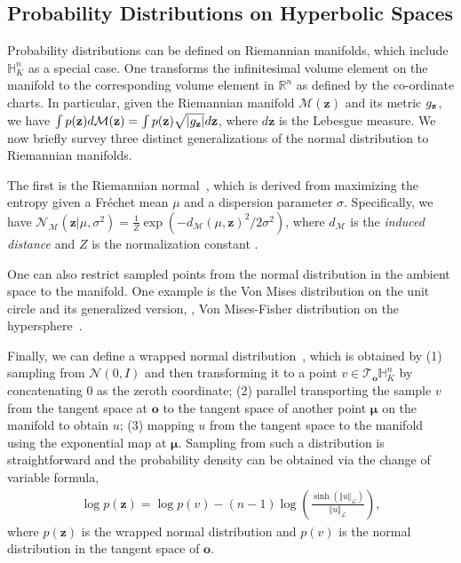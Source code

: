 \subsection{Probability Distributions on Hyperbolic Spaces}\label{sec:hyperprobs}

Probability distributions can be defined on Riemannian manifolds, which include $\mathbb{H}^n_K$ as a special case. One transforms the infinitesimal volume element on the manifold to the corresponding volume element in $\mathbb{R}^n$ as defined by the co-ordinate charts. In particular, given the Riemannian manifold $\mathcal{M}(\textbf{z})$ and its metric $g_{\mathbf{z}}$, we have $\int p(\textbf{z}) d\mathcal{M} (\textbf{z}) = \int p(\textbf{z})\sqrt{|g_{\mathbf{z}}|}d \textbf{z}$, where $d \textbf{z}$ is the Lebesgue measure. We now briefly survey three distinct generalizations of the normal distribution to Riemannian manifolds.

The first is the Riemannian normal~\cite{pennec2006intrinsic, said2014new}, which is derived from maximizing the entropy given a Fr\'echet mean $\mu$ and a dispersion parameter $\sigma$.
Specifically, we have $\mathcal{N}_{\mathcal{M}}(\textbf{z} \vert \mu, \sigma^{2}) = \frac{1}{Z} \exp \left( - d_{\mathcal{M}}(\mu, \textbf{z})^2 / 2 \sigma^{2} \right)$, where $d_{\mathcal{M}}$ is the \textit{induced distance} and $Z$ is the normalization constant \cite{said2014new, mathieu2019continuous}.

One can also restrict sampled points from the normal distribution in the ambient space to the manifold.
One example is the Von Mises distribution on the unit circle and its generalized version, \ie, Von Mises-Fisher distribution on the hypersphere~\cite{davidson2018hyperspherical}.

Finally, we can define a wrapped normal distribution~\cite{falorsi2019reparameterizing,nagano2019wrapped}, which is obtained by (1) sampling from $\mathcal{N}(0,I)$ and then transforming it to a point $v \in \mathcal{T}_\textbf{o}\mathbb{H}_K^n$ by concatenating $0$ as the zeroth coordinate; (2) parallel transporting the sample $v$ from the tangent space at $\textbf{o}$ to the tangent space of another point $\boldsymbol{\mu} $ on the manifold to obtain $u$; (3) mapping $u$ from the tangent space to the manifold using the exponential map at $\boldsymbol{\mu}$.
Sampling from such a distribution is straightforward and the probability density can be obtained via the change of variable formula,
\begin{align}
    \log p(\textbf{z}) = \log p(v) - (n-1) \log \left(\frac{\sinh{ ( \Vert u \Vert_{\mathcal{L}} ) }}{ \Vert u \Vert_{\mathcal{L}} } \right),
\end{align}
where $p(\textbf{z})$ is the wrapped normal distribution and $p(v)$ is the normal distribution in the tangent space of $\textbf{o}$.




